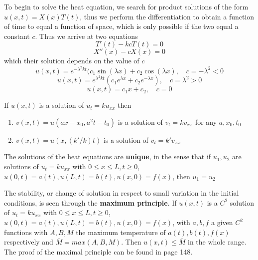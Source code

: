 \documentclass[12pt]{paper}
\begin{document}
To begin to solve the heat equation, we search for product solutions of the form $u(x,t)=X(x)T(t)$, thus we perform the differentiation to obtain a function of time to equal a function of space, which is only possible if the two equal a constant $c$. Thus we arrive at two equations
\begin{equation*}
T'(t)-kcT(t)=0
\end{equation*}
\begin{equation*}
X''(x)-cX(x)=0
\end{equation*}
which their solution depends on the value of $c$
\begin{equation*}
u(x,t)=e^{-\lambda^2kt}(c_1\sin(\lambda x)+c_2\cos(\lambda x) ,\quad c=-\lambda^2<0
\end{equation*}
\begin{equation*}
u(x,t)=e^{\lambda^2 kt}(c_1e^{\lambda x}+c_2e^{-\lambda x}),\quad c=\lambda^2 >0
\end{equation*}
\begin{equation*}
u(x,t)=c_1x+c_2, \quad c=0
\end{equation*}

If $u(x,t)$ is a solution of $u_t = ku_{xx}$ then
\begin{enumerate}
\item  $v(x,t)=u(ax-x_0,a^2t-t_0)$ is a solution of $v_t=kv_{xx}$ for any $a,x_0,t_0$
\item $v(x,t)=u(x,(k'/k)t)$ is a solution of $v_t=k'v_{xx}$
\end{enumerate}

The solutions of the heat equations are \textbf{unique}, in the sense that if $u_1,u_2$ are solutions of $u_t=ku_{xx}$ with $0\leq x\leq L, t\geq 0$, $u(0,t)=a(t), u(L,t)= b(t), u(x,0) = f(x)$, then $u_1=u_2$ 

The stability, or change of solution in respect to small variation in the initial conditions, is seen through the \textbf{maximum principle}. If $u(x,t)$ is a $C^2$ solution of $u_t=ku_{xx}$ with $0\leq x\leq L, t\geq 0$, $u(0,t)=a(t), u(L,t) = b(t), u(x,0) = f(x)$, with $a,b,f$ a given $C^2$ functions with $A,B,M$ the maximum temperature of $a(t),b(t),f(x)$ respectively and $\bar{M}=max(A,B,M)$. Then $u(x,t)\leq \bar{M}$ in the whole range. 
The proof of the maximal principle can be found in \cite{bleecker1992basic} page 148.
\end{document}
